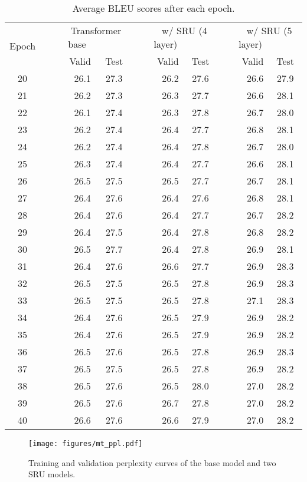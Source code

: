 \documentclass[11pt,a4paper]{article}
\begin{document}
\begin{table*}[!t!h!]
\fontsize{10.5}{12.2}\selectfont
\centering
\begin{tabular}{@{~~~}c@{~~~}|rc|rc|rc}
\toprule
\multirow{2}{*}{Epoch} & \multicolumn{2}{c|}{{~~~~}Transformer base{~~~~}} & \multicolumn{2}{c|}{{~~~~}w/ SRU (4 layer){~~~~}} & \multicolumn{2}{c}{{~~~~}w/ SRU (5 layer){~~~~}} \\
& {~~}Valid & Test & {~~}Valid & Test & {~~}Valid & Test \\
\midrule
20 & 26.1 & 27.3 & 26.2 & 27.6 & 26.6 & 27.9\\
21 & 26.2 & 27.3 & 26.3 & 27.7 & 26.6 & 28.1\\
22 & 26.1 & 27.4 & 26.3 & 27.8 & 26.7 & 28.0\\
23 & 26.2 & 27.4 & 26.4 & 27.7 & 26.8 & 28.1\\
24 & 26.2 & 27.4 & 26.4 & 27.8 & 26.7 & 28.0\\
25 & 26.3 & 27.4 & 26.4 & 27.7 & 26.6 & 28.1\\
26 & 26.5 & 27.5 & 26.5 & 27.7 & 26.7 & 28.1\\
27 & 26.4 & 27.6 & 26.4 & 27.6 & 26.8 & 28.1\\
28 & 26.4 & 27.6 & 26.4 & 27.7 & 26.7 & 28.2\\
29 & 26.4 & 27.5 & 26.4 & 27.8 & 26.8 & 28.2\\
30 & 26.5 & 27.7 & 26.4 & 27.8 & 26.9 & 28.1\\
31 & 26.4 & 27.6 & 26.6 & 27.7 & 26.9 & 28.3\\
32 & 26.5 & 27.5 & 26.5 & 27.8 & 26.9 & 28.3\\
33 & 26.5 & 27.5 & 26.5 & 27.8 & 27.1 & 28.3\\
34 & 26.4 & 27.6 & 26.5 & 27.9 & 26.9 & 28.2\\
35 & 26.4 & 27.6 & 26.5 & 27.9 & 26.9 & 28.2\\
36 & 26.5 & 27.6 & 26.5 & 27.8 & 26.9 & 28.3\\
37 & 26.5 & 27.5 & 26.5 & 27.8 & 26.9 & 28.2\\
38 & 26.5 & 27.6 & 26.5 & 28.0 & 27.0 & 28.2\\
39 & 26.5 & 27.6 & 26.7 & 27.8 & 27.0 & 28.2\\
40 & 26.6 & 27.6 & 26.6 & 27.9 & 27.0 & 28.2\\
\bottomrule
\end{tabular}
\caption{Average BLEU scores after each epoch.}
\label{table:full_mt}
\end{table*}
\begin{figure}[ht]
\texttt{[image: figures/mt\_ppl.pdf]}
\caption{Training and validation perplexity curves of the base model and two SRU models.}
\label{fig:mtppl}
\end{figure}
\end{document}
